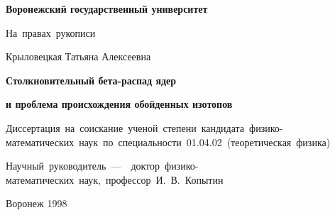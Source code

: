 \begin{titlepage}

\vspace{3 ex}

\centerline{\large\bf Воронежский  государственный университет}

\vspace{10 ex}

\hfill\hbox{На правах рукописи}

\vspace{12 ex}
\centerline{\large Крыловецкая Татьяна Алексеевна}
\vspace{3ex}
\centerline{\bf\large Столкновительный бета-распад ядер}
\centerline{\bf\large и проблема происхождения обойденных изотопов}

\vspace{14 ex}

\hfill\hbox{\vbox{\hbox{Диссертация на соискание ученой степени}
                  \hbox{кандидата физико-математических наук}
                  \hbox{по специальности 01.04.02 (теоретическая физика)}}}

\vspace{4 ex}

\vspace{3 ex}
\hfill\hbox{\vbox{\hbox{Научный руководитель --- }
                  \hbox{доктор физико-математических наук,}
                  \hbox{\large профессор И.~В.~Копытин}}}

\vfill
\centerline{\large Воронеж 1998}
\end{titlepage}

\endinput